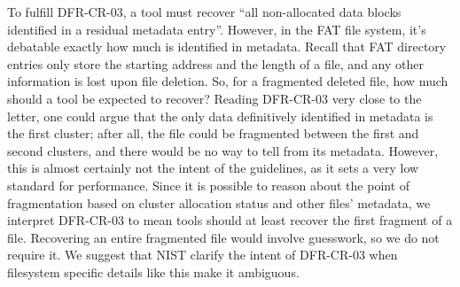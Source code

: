 To fulfill DFR-CR-03, a tool must recover ``all non-allocated data blocks identified in a residual metadata entry''\cite{meta:dfr:standards}.
However, in the FAT file system, it's debatable exactly how much is identified in metadata.
Recall that FAT directory entries only store the starting address and the length of a file, and any other information is lost upon file deletion.
So, for a fragmented deleted file, how much should a tool be expected to recover?
Reading DFR-CR-03 very close to the letter, one could argue that the only data definitively identified in metadata is the first cluster; after all, the file could be fragmented between the first and second clusters, and there would be no way to tell from its metadata.
However, this is almost certainly not the intent of the guidelines, as it sets a very low standard for performance.
Since it is possible to reason about the point of fragmentation based on cluster allocation status and other files' metadata, we interpret DFR-CR-03 to mean tools should at least recover the first fragment of a file.
Recovering an entire fragmented file would involve guesswork, so we do not require it.
We suggest that NIST clarify the intent of DFR-CR-03 when filesystem specific details like this make it ambiguous.

